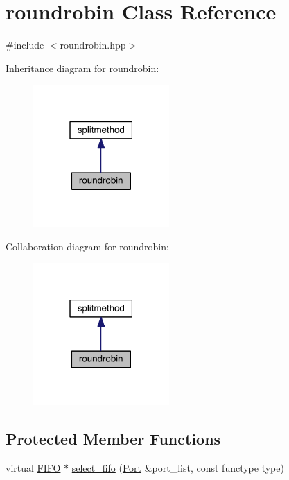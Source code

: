 \hypertarget{classroundrobin}{}\section{roundrobin Class Reference}
\label{classroundrobin}


{\ttfamily \#include $<$roundrobin.\+hpp$>$}



Inheritance diagram for roundrobin\+:
\nopagebreak
\begin{figure}[H]
\begin{center}
\leavevmode
\includegraphics[width=147pt]{classroundrobin__inherit__graph}
\end{center}
\end{figure}


Collaboration diagram for roundrobin\+:
\nopagebreak
\begin{figure}[H]
\begin{center}
\leavevmode
\includegraphics[width=147pt]{classroundrobin__coll__graph}
\end{center}
\end{figure}
\subsection*{Protected Member Functions}
\begin{DoxyCompactItemize}
\item 
virtual \hyperlink{class_f_i_f_o}{F\+I\+FO} $\ast$ \hyperlink{classroundrobin_acd670a96e62905062e50b21c3d5d64c5}{select\+\_\+fifo} (\hyperlink{class_port}{Port} \&port\+\_\+list, const functype type)
\end{DoxyCompactItemize}
